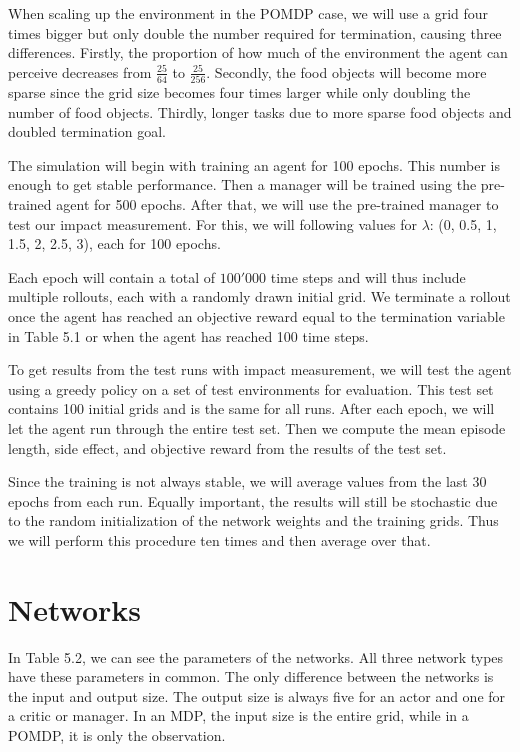 \documentclass[12pt,A4]{report}
\theoremstyle{definition}
\begin{document}
When scaling up the environment in the POMDP case, we will use a grid four times bigger but only double the number required for termination, causing three differences. Firstly, the proportion of how much of the environment the agent can perceive decreases from $\frac{25}{64}$ to $\frac{25}{256}$. Secondly, the food objects will become more sparse since the grid size becomes four times larger while only doubling the number of food objects. Thirdly, longer tasks due to more sparse food objects and doubled termination goal.

The simulation will begin with training an agent for 100 epochs. This number is enough to get stable performance. Then a manager will be trained using the pre-trained agent for 500 epochs. After that, we will use the pre-trained manager to test our impact measurement. For this, we will following values for $\lambda$: (0, 0.5, 1, 1.5, 2, 2.5, 3), each for 100 epochs. 

Each epoch will contain a total of $100'000$ time steps and will thus include multiple rollouts, each with a randomly drawn initial grid. We terminate a rollout once the agent has reached an objective reward equal to the termination variable in Table 5.1 or when the agent has reached 100 time steps.

To get results from the test runs with impact measurement, we will test the agent using a greedy policy on a set of test environments for evaluation. This test set contains 100 initial grids and is the same for all runs. After each epoch, we will let the agent run through the entire test set. Then we compute the mean episode length, side effect, and objective reward from the results of the test set. 

Since the training is not always stable, we will average values from the last 30 epochs from each run. Equally important, the results will still be stochastic due to the random initialization of the network weights and the training grids. Thus we will perform this procedure ten times and then average over that. 

\section{Networks}
In Table 5.2, we can see the parameters of the networks. All three network types have these parameters in common. The only difference between the networks is the input and output size. The output size is always five for an actor and one for a critic or manager. In an MDP, the input size is the entire grid, while in a POMDP, it is only the observation. 
\end{document}
